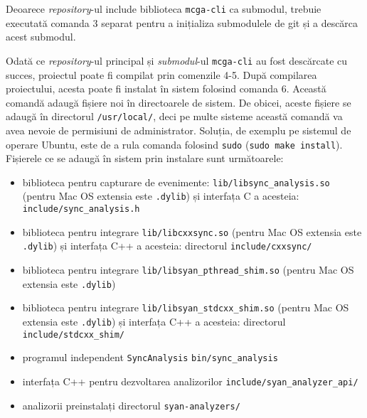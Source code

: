 Deoarece \textit{repository}-ul include biblioteca
\lstinline{mcga-cli}\cite{mcga-cli} ca submodul, trebuie executată
comanda 3 separat pentru a inițializa submodulele de git și a descărca
acest submodul.

Odată ce \textit{repository}-ul principal și \textit{submodul}-ul
\lstinline{mcga-cli} au fost descărcate cu succes, proiectul poate fi
compilat prin comenzile 4-5. După compilarea proiectului, acesta poate
fi instalat în sistem folosind comanda 6. Această comandă adaugă fișiere
noi în directoarele de sistem. De obicei, aceste fișiere se adaugă în
directorul \lstinline{/usr/local/}, deci pe multe sisteme această
comandă va avea nevoie de permisiuni de administrator. Soluția, de
exemplu pe sistemul de operare Ubuntu, este de a rula comanda folosind
\lstinline{sudo} (\lstinline{sudo make install}). Fișierele ce se adaugă
în sistem prin instalare sunt următoarele:

\begin{itemize}
    \item biblioteca pentru capturare de evenimente:
    \lstinline{lib/libsync_analysis.so} (pentru Mac OS extensia este
    \lstinline{.dylib}) și interfața C a acesteia:
    \lstinline{include/sync_analysis.h}
    \item biblioteca pentru integrare \lstinline{lib/libcxxsync.so}
    (pentru Mac OS extensia este \lstinline{.dylib}) și interfața C++ a
    acesteia: directorul \lstinline{include/cxxsync/}
    \item biblioteca pentru integrare
    \lstinline{lib/libsyan_pthread_shim.so} (pentru Mac OS extensia este
    \lstinline{.dylib})
    \item biblioteca pentru integrare
    \lstinline{lib/libsyan_stdcxx_shim.so} (pentru Mac OS extensia
    este \lstinline{.dylib}) și interfața C++ a acesteia: directorul
    \lstinline{include/stdcxx_shim/}
    \item programul independent \lstinline{SyncAnalysis}
    \lstinline{bin/sync_analysis}
    \item interfața C++ pentru dezvoltarea analizorilor
    \lstinline{include/syan_analyzer_api/}
    \item analizorii preinstalați directorul \lstinline{syan-analyzers/}
\end{itemize}
